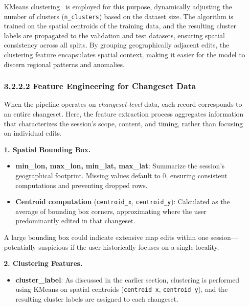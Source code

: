 \documentclass[
    13pt, %
    a4paper, %
    listof=totoc, %
    bibliography=totoc, %
    index=totoc, %
    headsepline
]{scrreprt}
\begin{document}
KMeans clustering~\cite{kmeans_review_2021, sklearn_kmeans, ibm_kmeans} is employed for this purpose, dynamically adjusting the number of clusters (\texttt{n\_clusters}) based on the dataset size. The algorithm is trained on the spatial centroids of the training data, and the resulting cluster labels are propagated to the validation and test datasets, ensuring spatial consistency across all splits. By grouping geographically adjacent edits, the clustering feature encapsulates spatial context, making it easier for the model to discern regional patterns and anomalies.

\subsubsection{3.2.2.2 Feature Engineering for Changeset Data}
\label{sec:features_changeset}

When the pipeline operates on \emph{changeset-level} data, each record corresponds to an entire changeset. Here, the feature extraction process aggregates information that characterizes the session’s scope, content, and timing, rather than focusing on individual edits.

\vspace{1em}
\noindent
\textbf{1. Spatial Bounding Box.}
\begin{itemize}
  \item \textbf{min\_lon, max\_lon, min\_lat, max\_lat}: Summarize the session’s geographical footprint. Missing values default to 0, ensuring consistent computations and preventing dropped rows.
  \item \textbf{Centroid computation} (\texttt{centroid\_x}, \texttt{centroid\_y}): Calculated as the average of bounding box corners, approximating where the user predominantly edited in that changeset.
\end{itemize}
A large bounding box could indicate extensive map edits within one session—potentially suspicious if the user historically focuses on a single locality.

\vspace{1em}
\noindent
\textbf{2. Clustering Features.}
\begin{itemize}
  \item \textbf{cluster\_label}: As discussed in the earlier section, clustering is performed using KMeans on spatial centroids (\texttt{centroid\_x}, \texttt{centroid\_y}), and the resulting cluster labels are assigned to each changeset.
\end{itemize}
\end{document}
